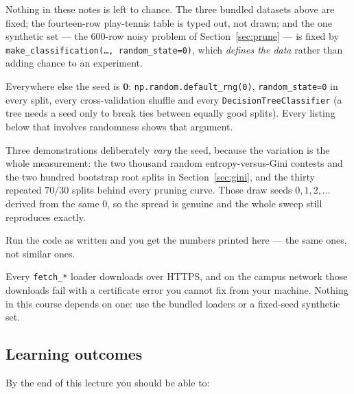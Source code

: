 \documentclass[11pt]{article}
\begin{document}
\begin{keyidea}
Nothing in these notes is left to chance. The three bundled datasets above are
fixed; the fourteen-row play-tennis table is typed out, not drawn; and the one
synthetic set --- the $600$-row noisy problem of Section~\ref{sec:prune} ---
is fixed by \texttt{make\_classification(\dots, random\_state=0)}, which
\emph{defines the data} rather than adding chance to an experiment.

Everywhere else the seed is $\mathbf{0}$: \texttt{np.random.default\_rng(0)},
\texttt{random\_state=0} in every split, every cross-validation shuffle and
every \texttt{DecisionTreeClassifier} (a tree needs a seed only to break ties
between equally good splits). Every listing below that involves randomness
shows that argument.

Three demonstrations deliberately \emph{vary} the seed, because the variation
is the whole measurement: the two thousand random entropy-versus-Gini contests
and the two hundred bootstrap root splits in Section~\ref{sec:gini}, and the
thirty repeated $70/30$ splits behind every pruning curve. Those draw seeds
$0, 1, 2, \dots$ derived from the same $0$, so the spread is genuine and the
whole sweep still reproduces exactly.

Run the code as written and you get the numbers printed here --- the same
ones, not similar ones.
\end{keyidea}

\begin{caution}
Every \texttt{fetch\_*} loader downloads over HTTPS, and on the campus network
those downloads fail with a certificate error you cannot fix from your machine.
Nothing in this course depends on one: use the bundled loaders or a
fixed-seed synthetic set.
\end{caution}

\subsection{Learning outcomes}

By the end of this lecture you should be able to:
\end{document}
